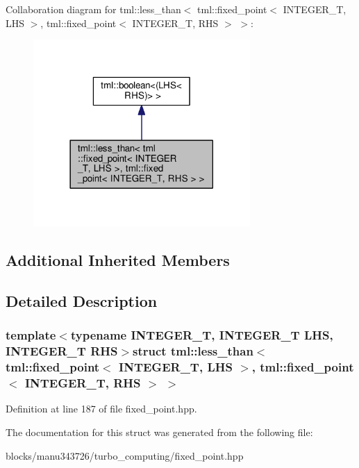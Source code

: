 Collaboration diagram for tml\+:\+:less\+\_\+than$<$ tml\+:\+:fixed\+\_\+point$<$ I\+N\+T\+E\+G\+E\+R\+\_\+\+T, L\+H\+S $>$, tml\+:\+:fixed\+\_\+point$<$ I\+N\+T\+E\+G\+E\+R\+\_\+\+T, R\+H\+S $>$ $>$\+:
\nopagebreak
\begin{figure}[H]
\begin{center}
\leavevmode
\includegraphics[width=234pt]{structtml_1_1less__than_3_01tml_1_1fixed__point_3_01_i_n_t_e_g_e_r___t_00_01_l_h_s_01_4_00_01tml08474ad4d66f46c50128a65da264fc2e}
\end{center}
\end{figure}
\subsection*{Additional Inherited Members}


\subsection{Detailed Description}
\subsubsection*{template$<$typename I\+N\+T\+E\+G\+E\+R\+\_\+\+T, I\+N\+T\+E\+G\+E\+R\+\_\+\+T L\+H\+S, I\+N\+T\+E\+G\+E\+R\+\_\+\+T R\+H\+S$>$struct tml\+::less\+\_\+than$<$ tml\+::fixed\+\_\+point$<$ I\+N\+T\+E\+G\+E\+R\+\_\+\+T, L\+H\+S $>$, tml\+::fixed\+\_\+point$<$ I\+N\+T\+E\+G\+E\+R\+\_\+\+T, R\+H\+S $>$ $>$}



Definition at line 187 of file fixed\+\_\+point.\+hpp.



The documentation for this struct was generated from the following file\+:\begin{DoxyCompactItemize}
\item 
blocks/manu343726/turbo\+\_\+computing/fixed\+\_\+point.\+hpp\end{DoxyCompactItemize}
